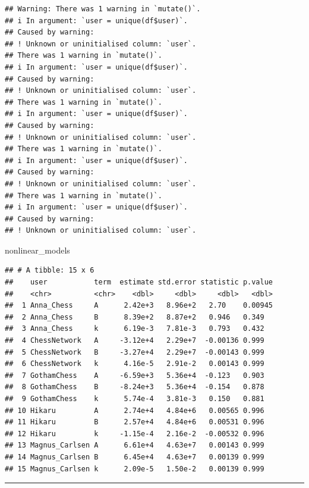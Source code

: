 \documentclass[
]{article}
\newenvironment{Shaded}{\begin{snugshade}}{\end{snugshade}}
\newcommand{\NormalTok}[1]{#1}
\begin{document}
\begin{verbatim}
## Warning: There was 1 warning in `mutate()`.
## i In argument: `user = unique(df$user)`.
## Caused by warning:
## ! Unknown or uninitialised column: `user`.
## There was 1 warning in `mutate()`.
## i In argument: `user = unique(df$user)`.
## Caused by warning:
## ! Unknown or uninitialised column: `user`.
## There was 1 warning in `mutate()`.
## i In argument: `user = unique(df$user)`.
## Caused by warning:
## ! Unknown or uninitialised column: `user`.
## There was 1 warning in `mutate()`.
## i In argument: `user = unique(df$user)`.
## Caused by warning:
## ! Unknown or uninitialised column: `user`.
## There was 1 warning in `mutate()`.
## i In argument: `user = unique(df$user)`.
## Caused by warning:
## ! Unknown or uninitialised column: `user`.
\end{verbatim}

\begin{Shaded}
\begin{Highlighting}[]
\NormalTok{nonlinear\_models}
\end{Highlighting}
\end{Shaded}

\begin{verbatim}
## # A tibble: 15 x 6
##    user           term  estimate std.error statistic p.value
##    <chr>          <chr>    <dbl>     <dbl>     <dbl>   <dbl>
##  1 Anna_Chess     A      2.42e+3   8.96e+2   2.70    0.00945
##  2 Anna_Chess     B      8.39e+2   8.87e+2   0.946   0.349  
##  3 Anna_Chess     k      6.19e-3   7.81e-3   0.793   0.432  
##  4 ChessNetwork   A     -3.12e+4   2.29e+7  -0.00136 0.999  
##  5 ChessNetwork   B     -3.27e+4   2.29e+7  -0.00143 0.999  
##  6 ChessNetwork   k      4.16e-5   2.91e-2   0.00143 0.999  
##  7 GothamChess    A     -6.59e+3   5.36e+4  -0.123   0.903  
##  8 GothamChess    B     -8.24e+3   5.36e+4  -0.154   0.878  
##  9 GothamChess    k      5.74e-4   3.81e-3   0.150   0.881  
## 10 Hikaru         A      2.74e+4   4.84e+6   0.00565 0.996  
## 11 Hikaru         B      2.57e+4   4.84e+6   0.00531 0.996  
## 12 Hikaru         k     -1.15e-4   2.16e-2  -0.00532 0.996  
## 13 Magnus_Carlsen A      6.61e+4   4.63e+7   0.00143 0.999  
## 14 Magnus_Carlsen B      6.45e+4   4.63e+7   0.00139 0.999  
## 15 Magnus_Carlsen k      2.09e-5   1.50e-2   0.00139 0.999
\end{verbatim}

\begin{center}\rule{0.5\linewidth}{0.5pt}\end{center}
\end{document}
